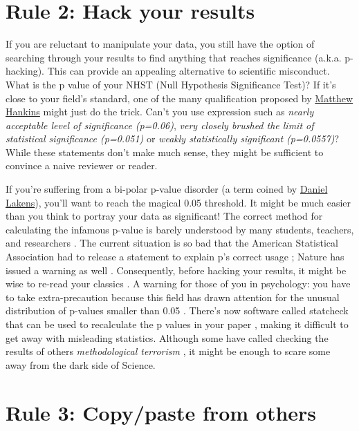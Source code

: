\documentclass[a4paper,10pt,onecolumn]{article}
\begin{document}
\section*{Rule 2: Hack your results}

If you are reluctant to manipulate your data, you still have the option of
searching through your results to find anything that reaches significance 
(a.k.a. p-hacking). This can provide an appealing alternative to scientific misconduct. What is the p value of your NHST (Null Hypothesis
Significance Test)? If it's close to your field's standard, one of the many qualification
proposed by
\href{https://mchankins.wordpress.com/2013/04/21/still-not-significant-2/}{Matthew
  Hankins} might just do the trick. Can't you use expression such as {\em nearly
  acceptable level of significance (p=0.06)}, {\em very closely brushed the
  limit of statistical significance (p=0.051)} or {\em weakly statistically
  significant (p=0.0557)}? While these statements don't make much sense, they might
be sufficient to convince a naive reviewer or reader. 

If you're
suffering from a bi-polar p-value disorder (a term coined by
\href{http://daniellakens.blogspot.fr/2014/05/the-probability-of-p-values-as-function.html}{Daniel
  Lakens}), you'll want to reach the magical 0.05 threshold. It might be much easier than you think to portray your data as significant! The correct method for calculating the
infamous p-value is barely understood by many students, teachers, and
researchers \citep{haller:2002,lecoutre:2003}. The current situation is so bad that the American Statistical Association had to release a
statement to explain p's correct usage \citep{wasserstein:2016};
Nature has issued a warning as well
\citep{baker:2016}. Consequently, before hacking your results, it might be wise
to re-read your classics
\citep{simmons:2011,cumming:2012a,cumming:2012b,colquhoun:2014}. A warning for those of you in psychology: you have to take extra-precaution because this field has drawn attention for the unusual distribution of
p-values smaller than 0.05 \citep{hartgerink:2016,bakker:2012}. There's now software called statcheck that can be used to recalculate the p values in your paper \citep{nuijten:2015,epskamp:2016}, making it difficult to get away with misleading statistics. Although some have called checking the results of others {\em
  methodological terrorism} \citep{finske:2016}, it might be enough to scare some away from the dark side of Science.


\section*{Rule 3: Copy/paste from others}
\end{document}
